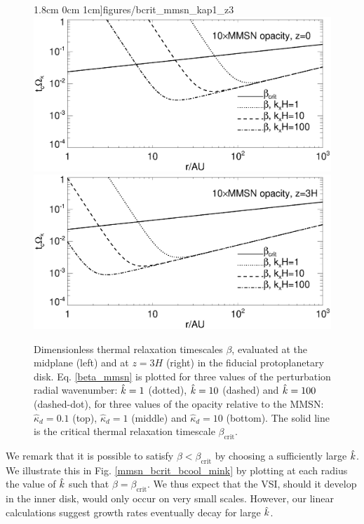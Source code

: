 \begin{figure}
  1.8cm 0cm 1cm]{figures/bcrit_mmsn_kap1_z3}\\
  \includegraphics[scale=.47,clip=true,trim=0cm 0cm 0cm
  1cm]{figures/bcrit_mmsn_kap10_z0}\includegraphics[scale=.47,clip=true,trim=2.5cm 0cm 0cm
  1cm]{figures/bcrit_mmsn_kap10_z3} 
  \caption{Dimensionless thermal relaxation timescales $\beta$,
    evaluated at the midplane (left) and at $z=3H$ (right) in the
    fiducial protoplanetary disk. Eq. \ref{beta_mmsn} is plotted  
    for three values of the 
    perturbation radial wavenumber: $\hat{k}=1$ (dotted), $\hat{k}=10$
    (dashed) and $\hat{k}=100$ (dashed-dot), for three values of the
    opacity relative to the MMSN: $\hat{\kappa}_d=0.1$ (top),
    $\hat{\kappa}_d=1$ (middle) and $\hat{\kappa}_d=10$ (bottom).  
    The solid line is the 
    critical thermal relaxation timescale $\beta_\mathrm{crit}$. 
    \label{mmsn_bcrit_bcool}}   
\end{figure}  

We remark that it is possible to satisfy $\beta < \beta_\mathrm{crit}$
by choosing a sufficiently large $\hat{k}$. We
illustrate this in Fig. \ref{mmsn_bcrit_bcool_mink} by plotting at
each radius the value of $\hat{k}$ such 
that $\beta = \beta_\mathrm{crit}$. We thus expect that the VSI,
should it develop in the inner disk, would only occur on very small
scales. However, our linear calculations suggest growth rates
eventually decay for large $\hat{k}$. 

